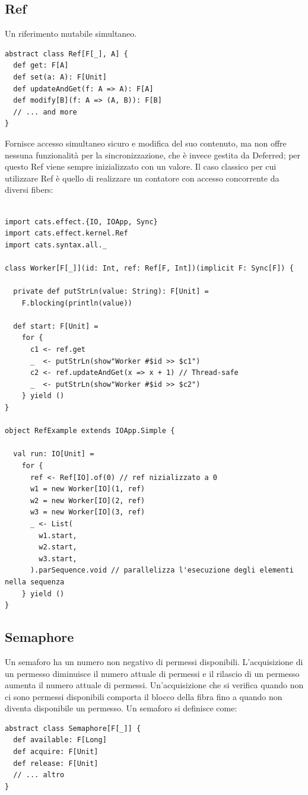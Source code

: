 \subsection{Ref}
Un riferimento mutabile simultaneo.
\begin{verbatim}
abstract class Ref[F[_], A] {
  def get: F[A]
  def set(a: A): F[Unit]
  def updateAndGet(f: A => A): F[A]
  def modify[B](f: A => (A, B)): F[B]
  // ... and more
}
\end{verbatim}
Fornisce accesso simultaneo sicuro e modifica del suo contenuto, ma non offre nessuna funzionalità per la sincronizzazione, che è invece gestita da Deferred; per questo Ref viene sempre inizializzato con un valore. Il caso classico per cui utilizzare Ref è quello di realizzare un contatore con accesso concorrente da diversi fibers:

\begin{verbatim}

import cats.effect.{IO, IOApp, Sync}
import cats.effect.kernel.Ref
import cats.syntax.all._

class Worker[F[_]](id: Int, ref: Ref[F, Int])(implicit F: Sync[F]) {

  private def putStrLn(value: String): F[Unit] =
    F.blocking(println(value))

  def start: F[Unit] =
    for {
      c1 <- ref.get
      _  <- putStrLn(show"Worker #$id >> $c1")
      c2 <- ref.updateAndGet(x => x + 1) // Thread-safe
      _  <- putStrLn(show"Worker #$id >> $c2")
    } yield ()
}

object RefExample extends IOApp.Simple {

  val run: IO[Unit] =
    for {
      ref <- Ref[IO].of(0) // ref nizializzato a 0
      w1 = new Worker[IO](1, ref)
      w2 = new Worker[IO](2, ref)
      w3 = new Worker[IO](3, ref)
      _ <- List(
        w1.start,
        w2.start,
        w3.start,
      ).parSequence.void // parallelizza l'esecuzione degli elementi nella sequenza
    } yield ()
}
\end{verbatim}

\subsection{Semaphore}
Un semaforo ha un numero non negativo di permessi disponibili. L'acquisizione di un permesso diminuisce il numero attuale di permessi e il rilascio di un permesso aumenta il numero attuale di permessi. Un'acquisizione che si verifica quando non ci sono permessi disponibili comporta il blocco della fibra fino a quando non diventa disponibile un permesso. Un semaforo si definisce come:
\begin{verbatim}
abstract class Semaphore[F[_]] {
  def available: F[Long]
  def acquire: F[Unit]
  def release: F[Unit]
  // ... altro
}
    
\end{verbatim}

